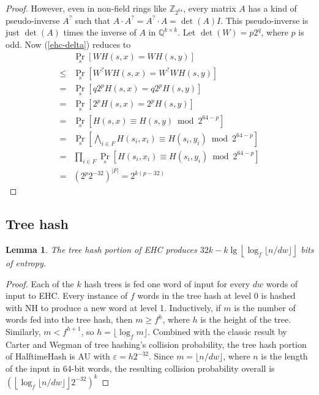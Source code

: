 \documentclass[sigconf, nonacm]{acmart}
\newtheorem*{lemma}{Lemma}
\newcommand{\rats}{\mathbb{Q}}
\newcommand{\ints}{\mathbb{Z}}
\begin{document}
\begin{proof}
However, even in non-field rings like $\ints_{2^{64}}$, every matrix $A$ has a kind of pseudo-inverse $A^?$ such that $A \cdot A^? = A^? \cdot A = \det(A) I$.
This pseudo-inverse is just $\det(A)$ times the inverse of $A$ in $\rats^{k\times{}k}$.
Let $\det(W) = p2^q$, where $p$ is odd.
Now (\ref{ehc-delta}) reduces to
\[
\begin{array}{rl}
  &  \Pr_s[W H(s,x) = W H(s,y)]\\
  \leq & \Pr_s[W^?WH(s,x) = W^?WH(s,y)] \\
  = & \Pr_s[q2^pH(s,x) = q2^pH(s,y)] \\
  = & \Pr_s[2^pH(s,x) = 2^pH(s,y)] \\
  = & \Pr_s[H(s,x) \equiv H(s,y) \bmod 2^{64-p}] \\
  = & \Pr_s\left[\bigwedge_{i \in F} H(s_i,x_i) \equiv H(s_i,y_i) \bmod 2^{64-p}\right] \\
  = & \prod_{i \in F} \Pr_s\left[ H(s_i,x_i) \equiv H(s_i,y_i) \bmod 2^{64-p}\right] \\
  = & \left(2^p 2^{-32}\right)^{|F|} = 2^{k(p-32)}
\end{array}
\]
\end{proof}


\subsection{Tree hash}

\begin{lemma}
The tree hash portion of EHC produces $32k - k\lg\left\lfloor\log_f \lfloor n/dw\rfloor\right\rfloor$ bits of entropy.
\end{lemma}
\begin{proof}
Each of the $k$ hash trees is fed one word of input for every $dw$ words of input to EHC.
Every instance of $f$ words in the tree hash at level 0 is hashed with NH to produce a new word at level 1.
Inductively, if $m$ is the number of words fed into the tree hash, then $m \geq f^h$, where $h$ is the height of the tree.
Similarly, $m < f^{h+1}$, so $h = \lfloor \log_f m \rfloor$.
Combined with the classic result by Carter and Wegman of tree hashing's collision probability, the tree hash portion of HalftimeHash is AU with $\varepsilon = h 2^{-32}$.
Since $m = \lfloor n / d w \rfloor$, where $n$ is the length of the input in 64-bit words, the resulting collision probability overall is $\left(\left\lfloor \log_f \lfloor n / d w \rfloor \right\rfloor 2^{-32}\right)^k$
\end{proof}
\end{document}
